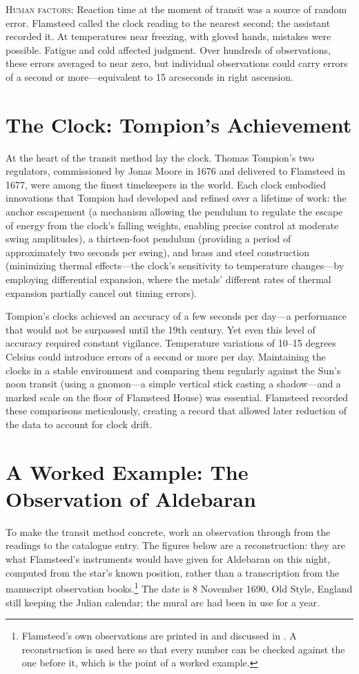 \textsc{Human factors:} Reaction time at the moment of transit was a source of random error. Flamsteed called the clock reading to the nearest second; the assistant recorded it. At temperatures near freezing, with gloved hands, mistakes were possible. Fatigue and cold affected judgment. Over hundreds of observations, these errors averaged to near zero, but individual observations could carry errors of a second or more—equivalent to 15 arcseconds in right ascension.

\section{The Clock: Tompion's Achievement}

At the heart of the transit method lay the clock. Thomas Tompion's two regulators, commissioned by Jonas Moore in 1676 and delivered to Flamsteed in 1677, were among the finest timekeepers in the world. Each clock embodied innovations that Tompion had developed and refined over a lifetime of work: the anchor escapement (a mechanism allowing the pendulum to regulate the escape of energy from the clock's falling weights, enabling precise control at moderate swing amplitudes), a thirteen-foot pendulum (providing a period of approximately two seconds per swing), and brass and steel construction (minimizing thermal effects—the clock's sensitivity to temperature changes—by employing differential expansion, where the metals' different rates of thermal expansion partially cancel out timing errors).

Tompion's clocks achieved an accuracy of a few seconds per day—a performance that would not be surpassed until the 19th century. Yet even this level of accuracy required constant vigilance. Temperature variations of 10–15 degrees Celsius could introduce errors of a second or more per day. Maintaining the clocks in a stable environment and comparing them regularly against the Sun's noon transit (using a gnomon—a simple vertical stick casting a shadow—and a marked scale on the floor of Flamsteed House) was essential. Flamsteed recorded these comparisons meticulously, creating a record that allowed later reduction of the data to account for clock drift.

\section{A Worked Example: The Observation of Aldebaran}

To make the transit method concrete, work an observation through from the readings to the catalogue entry. The figures below are a reconstruction: they are what Flamsteed's instruments would have given for Aldebaran on this night, computed from the star's known position, rather than a transcription from the manuscript observation books.\footnote{Flamsteed's own observations are printed in \textcite{Flamsteed1725} and discussed in \textcite{Baily1835}. A reconstruction is used here so that every number can be checked against the one before it, which is the point of a worked example.} The date is 8 November 1690, Old Style, England still keeping the Julian calendar; the mural arc had been in use for a year.

